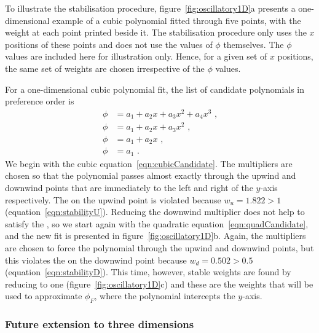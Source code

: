 To illustrate the stabilisation procedure, figure~\ref{fig:oscillatory1D}a presents a one-dimensional example of a cubic polynomial fitted through five points, with the weight at each point printed beside it.
The stabilisation procedure only uses the $x$ positions of these points and does not use the values of $\phi$ themselves.  The $\phi$ values are included here for illustration only.
Hence, for a given set of $x$ positions, the same set of weights are chosen irrespective of the $\phi$ values.

For a one-dimensional cubic polynomial fit, the list of candidate polynomials in preference order is
\begin{align}
	\phi &= a_1 + a_2 x + a_3 x^2 + a_4 x^3 \label{eqn:cubicCandidate} \text{ ,} \\
	\phi &= a_1 + a_2 x + a_3 x^2 \label{eqn:quadCandidate} \text{ ,} \\
	\phi &= a_1 + a_2 x \text{ ,} \\
	\phi &= a_1 \text{ .}
\end{align}
We begin with the cubic equation~\eqref{eqn:cubicCandidate}.  The multipliers are chosen so that the polynomial passes almost exactly through the upwind and downwind points that are immediately to the left and right of the $y$-axis respectively.
The  on the upwind point is violated because $w_u = 1.822 > 1$ (equation~\ref{eqn:stabilityU}).  Reducing the downwind multiplier does not help to satisfy the , so we start again with the quadratic equation~\eqref{eqn:quadCandidate}, and the new fit is presented in figure~\ref{fig:oscillatory1D}b.
Again, the multipliers are chosen to force the polynomial through the upwind and downwind points, but this violates the  on the downwind point because $w_d = 0.502 > 0.5$ (equation~\ref{eqn:stabilityD}).  This time, however, stable weights are found by reducing  to one (figure~\ref{fig:oscillatory1D}c) and these are the weights that will be used to approximate $\phi_F$, where the polynomial intercepts the $y$-axis.

\subsubsection{Future extension to three dimensions}

